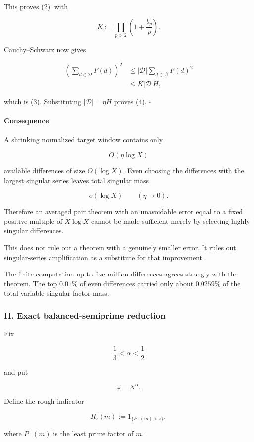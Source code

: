This proves (2), with

\[
K:=\prod_{p>2}\left(1+\frac{b_p}{p}\right).
\]

Cauchy--Schwarz now gives

\[
\begin{aligned}
\left(\sum_{d\in\mathcal D}F(d)\right)^2
&\le
|\mathcal D|
\sum_{d\in\mathcal D}F(d)^2\\
&\le
K|\mathcal D|H,
\end{aligned}
\]

which is (3). Substituting \(|\mathcal D|=\eta H\) proves (4). \(\square\)

\paragraph{Consequence}

A shrinking normalized target window contains only

\[
O(\eta\log X)
\]

available differences of size \(O(\log X)\). Even choosing the differences with the largest singular series leaves total singular mass

\[
o(\log X)
\qquad(\eta\to0).
\]

Therefore an averaged pair theorem with an unavoidable error equal to a fixed positive multiple of \(X\log X\) cannot be made sufficient merely by selecting highly singular differences.

This does not rule out a theorem with a genuinely smaller error. It rules out singular-series amplification as a substitute for that improvement.

The finite computation up to five million differences agrees strongly with the theorem. The top \(0.01\%\) of even differences carried only about \(0.0259\%\) of the total variable singular-factor mass.

\subsubsection*{II. Exact balanced-semiprime reduction}

Fix

\[
\frac13<\alpha<\frac12
\]

and put

\[
z=X^\alpha.
\]

Define the rough indicator

\[
R_z(m):=
1_{\{P^-(m)>z\}},
\]

where \(P^-(m)\) is the least prime factor of \(m\).

